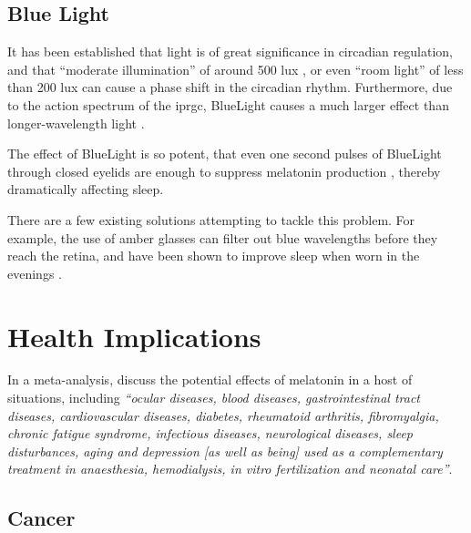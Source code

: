 \subsection{Blue Light}

It has been established that light is of great significance in circadian regulation, and that ``moderate illumination'' of around 500 lux \citep{laaksoOnehourExposureModerate1993}, or even ``room light'' of less than 200 lux \citep{gooleyExposureRoomLight2011} can cause a phase shift in the circadian rhythm. Furthermore, due to the action spectrum of the \acrshort{iprgc}, \gls{BlueLight} causes a much larger effect than longer-wavelength light \citep{lockleyHighSensitivityHuman2003}.

The effect of \gls{BlueLight} is so potent, that even one second pulses of \gls{BlueLight} through closed eyelids are enough to suppress melatonin production \citep{figueiroTrainBlueLight2013}, thereby dramatically affecting sleep. 

There are a few existing solutions attempting to tackle this problem. For example, the use of amber glasses can filter out blue wavelengths before they reach the retina, and have been shown to improve sleep when worn in the evenings \citep{kimberlyAmberLensesBlock2009}.






\section{Health Implications}
\label{Sec:Health}


In a meta-analysis, \citet{sanchez-barceloClinicalUsesMelatonin2010} discuss the potential effects of melatonin in a host of situations, including \textit{``ocular diseases, blood diseases, gastrointestinal tract diseases, cardiovascular diseases, diabetes, rheumatoid arthritis, fibromyalgia, chronic fatigue syndrome, infectious diseases, neurological diseases, sleep disturbances, aging and depression [as well as being] used as a complementary treatment in anaesthesia, hemodialysis, in vitro fertilization and neonatal care''}.

\subsection{Cancer}

